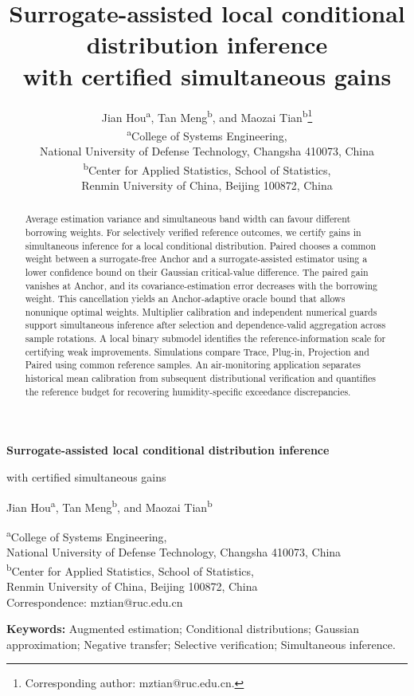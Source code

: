 \documentclass[12pt,a4paper]{article}
\title{Surrogate-assisted local conditional distribution inference\\with certified simultaneous gains}
\author{Jian Hou\textsuperscript{a}, Tan Meng\textsuperscript{b}, and Maozai Tian\textsuperscript{b}\thanks{Corresponding author: mztian@ruc.edu.cn.}\\[.4em]
\normalsize\textsuperscript{a}College of Systems Engineering,\\
\normalsize National University of Defense Technology, Changsha 410073, China\\
\normalsize\textsuperscript{b}Center for Applied Statistics, School of Statistics,\\\normalsize Renmin University of China, Beijing 100872, China}
\date{}
\begin{document}
\begin{center}
{\Large\bfseries Surrogate-assisted local conditional distribution inference\par
with certified simultaneous gains\par}
\vspace{0.8em}
{\normalsize Jian Hou\textsuperscript{a}, Tan Meng\textsuperscript{b}, and Maozai Tian\textsuperscript{b}\par}
\vspace{0.4em}
\begin{minipage}{\textwidth}\centering\normalsize{}
\textsuperscript{a}College of Systems Engineering,\\
National University of Defense Technology, Changsha 410073, China\\[0.4em]
\textsuperscript{b}Center for Applied Statistics, School of Statistics,\\
Renmin University of China, Beijing 100872, China\\[0.4em]
Correspondence: mztian@ruc.edu.cn
\end{minipage}
\end{center}
\begin{abstract}\normalsize
Average estimation variance and simultaneous band width can favour different borrowing weights.
For selectively verified reference outcomes, we certify gains in simultaneous inference for a local conditional distribution.
Paired chooses a common weight between a surrogate-free Anchor and a surrogate-assisted estimator using a lower confidence bound on their Gaussian critical-value difference.
The paired gain vanishes at Anchor, and its covariance-estimation error decreases with the borrowing weight.
This cancellation yields an Anchor-adaptive oracle bound that allows nonunique optimal weights.
Multiplier calibration and independent numerical guards support simultaneous inference after selection and dependence-valid aggregation across sample rotations.
A local binary submodel identifies the reference-information scale for certifying weak improvements.
Simulations compare Trace, Plug-in, Projection and Paired using common reference samples.
An air-monitoring application separates historical mean calibration from subsequent distributional verification and quantifies the reference budget for recovering humidity-specific exceedance discrepancies.
\end{abstract}
\noindent\textbf{Keywords:} Augmented estimation; Conditional distributions; Gaussian approximation; Negative transfer; Selective verification; Simultaneous inference.








\clearpage
\end{document}
